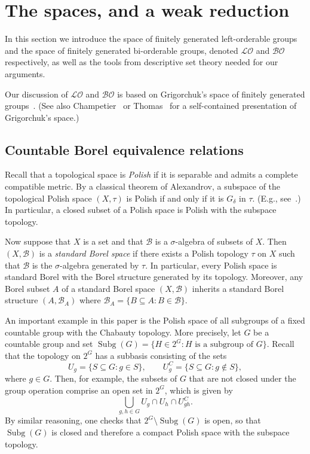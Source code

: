 \documentclass{amsart}
\theoremstyle{definition}
\theoremstyle{remark}
\DeclareMathOperator{\Subg}{Subg}
\begin{document}
\section{The spaces, and a weak reduction}
\label{sec:spaces}



In this section
we introduce the space of finitely generated left-orderable groups and the space of finitely generated bi-orderable groups, denoted $\mathcal{LO}$ and $\mathcal{BO}$ respectively, as well as the tools from descriptive set theory needed for our arguments. 

Our discussion of $\mathcal{LO}$ and $\mathcal{BO}$ is based on Grigorchuk's space of finitely generated groups~\cite{Gri84,Gri05}. (See also Champetier~\cite{Cha00} or Thomas~\cite{Tho08} for a self-contained presentation of Grigorchuk's space.)

\subsection{Countable Borel equivalence relations}
Recall that a topological space is \emph{Polish}  if it is separable and admits a complete compatible metric. By a classical theorem of Alexandrov, a subspace of the topological Polish space \((X,\tau)\) is Polish if and only if it is \(G_\delta\) in \(\tau\). (E.g., see~\cite[Theorem~3.11]{Kec}.) In particular, a closed subset of a Polish space is Polish with the subspace topology.

Now suppose that \(X\) is a set and that \(\mathcal{B}\) is a \(\sigma\)-algebra of subsets
of \(X\). Then \(( X, \mathcal{B})\) is a \emph{standard Borel space} if there exists a Polish topology \(\tau\) on
\(X\) such that \(\mathcal{B}\) is the \(\sigma\)-algebra generated by \(\tau\). 
In particular, every Polish space is standard Borel with the Borel structure generated by its topology. Moreover, any Borel subset \(A\) of a standard Borel space \((X,\mathcal{B})\) inherits a standard Borel structure \((A,\mathcal{B}_ A)\) where \(\mathcal{B}_A=\{B\subseteq A : B\in \mathcal{B}\}\).

An important example in this paper is the Polish space of all subgroups of a fixed countable group with the Chabauty topology. More precisely, let \(G\) be a countable group and set \(\Subg(G) = \{H \in 2^G : H\text{ is a subgroup of }G\}\).    Recall that the topology on $2^G$  has a subbasis consisting of the sets \[
    U_g=\{S\subseteq G : g\in S\},\qquad U^C_g=\{S\subseteq G : g\notin S\}, 
    \] 
 where $g \in G$.  Then, for example, the subsets of $G$ that are not closed under the group operation comprise an open set in $2^G$, which is given by
 \[ \bigcup_{g, h \in G} U_g \cap U_h \cap U_{gh}^C.
 \]
By similar reasoning, one checks that $2^G \setminus \Subg(G)$ is open, so that \(\Subg(G)\) is closed and therefore a compact Polish space with the subspace topology.  
\end{document}
